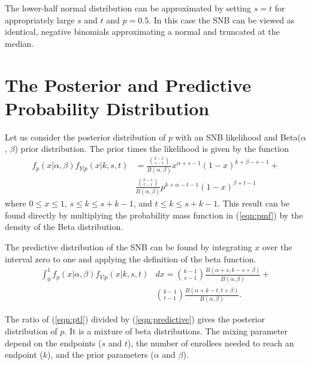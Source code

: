 \documentclass[review]{elsarticle}
\begin{document}
The lower-half normal distribution can be approximated by setting $s=t$
for appropriately large $s$ and $t$ and $p = 0.5$. In this
case the SNB can be viewed as identical, negative binomials
approximating a normal and truncated at the median.

\section{The Posterior and Predictive Probability Distribution}

Let us consider the posterior distribution of $p$ with an SNB likelihood 
and Beta($\alpha$, $\beta$) prior distribution.
The prior times the likelihood is given by the function
\begin{align} \label{eqn:ptl}
f_p(x | \alpha, \beta ) f_{Y|p}(x | k, s, t) &= 
  \frac{ {k-1 \choose s-1} }{B(\alpha, \beta)} x^{\alpha +s -1} 
    (1-x)^{k+\beta-s-1} + \\
  & \frac{ {k-1 \choose t-1} }{B(\alpha, \beta)} p^{k+\alpha -t -1} 
    (1-x)^{\beta+t-1} \nonumber
\end{align}
where $0 \leq x \leq 1$, $s \leq k \leq s+k-1$, and $t \leq k \leq s+k-1$.
This result can be found directly by multiplying the probability mass function
in (\ref{eqn:pmf}) by the density of the Beta distribution.

The predictive distribution of the SNB can be found by integrating
$x$ over the interval zero to one and applying the definition of the 
beta function.
\begin{align} \label{eqn:predictive}
\int_0^1 f_p(x | \alpha, \beta )  f_{Y|p}(x | k, s, t) & dx = 
  {k-1 \choose s-1} \frac{B\left(\alpha+s, k-s+\beta \right)}{B(\alpha, \beta)} 
    + \nonumber \\
  & {k-1 \choose t-1} 
    \frac{B\left(\alpha + k - t, t+\beta\right)}{B(\alpha, \beta)}.
\end{align}

The ratio of (\ref{eqn:ptl}) divided by (\ref{eqn:predictive}) gives the 
posterior distribution of $p$. It is a mixture of beta distributions. The
mixing parameter depend on the endpoints ($s$ and $t$), the number of enrollees needed to reach an endpoint ($k$), and the prior parameters ($\alpha$ and
$\beta$).
\end{document}

